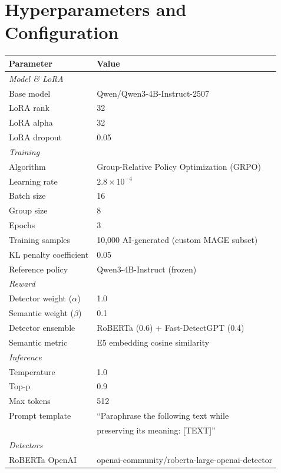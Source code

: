 \documentclass[11pt]{article}
\begin{document}
\FloatBarrier
\section{Hyperparameters and Configuration}
\label{sec:hyperparams}

\begin{table}[H]
\centering
\small
\begin{tabular}{ll}
\toprule
\textbf{Parameter} & \textbf{Value} \\
\midrule
\multicolumn{2}{l}{\textit{Model \& LoRA}} \\
Base model & Qwen/Qwen3-4B-Instruct-2507 \\
LoRA rank & 32 \\
LoRA alpha & 32 \\
LoRA dropout & 0.05 \\
\midrule
\multicolumn{2}{l}{\textit{Training}} \\
Algorithm & Group-Relative Policy Optimization (GRPO) \\
Learning rate & $2.8 \times 10^{-4}$ \\
Batch size & 16 \\
Group size & 8 \\
Epochs & 3 \\
Training samples & 10,000 AI-generated (custom MAGE subset) \\
KL penalty coefficient & 0.05 \\
Reference policy & Qwen3-4B-Instruct (frozen) \\
\midrule
\multicolumn{2}{l}{\textit{Reward}} \\
Detector weight ($\alpha$) & 1.0 \\
Semantic weight ($\beta$) & 0.1 \\
Detector ensemble & RoBERTa (0.6) + Fast-DetectGPT (0.4) \\
Semantic metric & E5 embedding cosine similarity \\
\midrule
\multicolumn{2}{l}{\textit{Inference}} \\
Temperature & 1.0 \\
Top-p & 0.9 \\
Max tokens & 512 \\
Prompt template & ``Paraphrase the following text while \\
& preserving its meaning: [TEXT]'' \\
\midrule
\multicolumn{2}{l}{\textit{Detectors}} \\
RoBERTa OpenAI & openai-community/roberta-large-openai-detector \\

\end{tabular}
\end{table}
\end{document}
